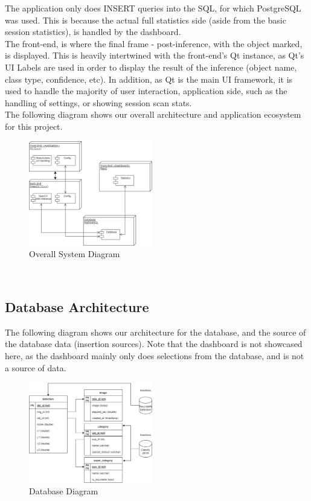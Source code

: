 \documentclass[conference]{IEEEtran}
\begin{document}
The application only does INSERT queries into the SQL, for which PostgreSQL was used. This is because the actual full statistics side (aside from the basic session statistics), is handled by the dashboard.\\

The front-end, is where the final frame - post-inference, with the object marked, is displayed. This is heavily intertwined with the front-end's Qt instance, as Qt's UI Labels are used in order to display the result of the inference (object name, class type, confidence, etc). In addition, as Qt is the main UI framework, it is used to handle the majority of user interaction, application side, such as the handling of settings, or showing session scan stats.\\

The following diagram shows our overall architecture and application ecosystem for this project.\\

\begin{figure}[h]
    \centering
    \includegraphics[width=0.48\textwidth]{images/app_diagram.eps}
    \caption{Overall System Diagram}
\end{figure}~\\

\subsection{Database Architecture}
The following diagram shows our architecture for the database, and the source of the database data (insertion sources). Note that the dashboard is not showcased here, as the dashboard mainly only does selections from the database, and is not a source of data.

\begin{figure}[h]
    \centering
    \includegraphics[width=0.48\textwidth]{images/db_diagram.eps}
    \caption{Database Diagram}
\end{figure}
\end{document}

